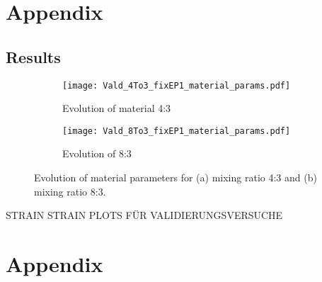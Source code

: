 \begin{appendices}
    \chapter{Appendix}
    \section{Results}


    \begin{figure}[H]
    \centering
    \begin{subfigure}[t]{1.0\textwidth}
        \centering
        \texttt{[image: Vald\_4To3\_fixEP1\_material\_params.pdf]}
        \caption{Evolution of material 4:3}
        \label{fig:material_params_4to3}
    \end{subfigure}
    \begin{subfigure}[t]{1.0\textwidth}
        \centering
        \texttt{[image: Vald\_8To3\_fixEP1\_material\_params.pdf]}
        \caption{Evolution of 8:3}
        \label{fig:material_params_8to3}
    \end{subfigure}
    \caption{Evolution of material parameters for (a) mixing ratio 4:3 and (b) mixing ratio 8:3.}
    \label{fig:validation_material_params}
    \end{figure}

    STRAIN STRAIN PLOTS FÜR VALIDIERUNGSVERSUCHE
    \chapter{Appendix}
\end{appendices}